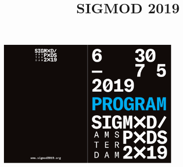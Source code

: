 \documentclass[10pt,paper=a6,twoside=true,BCOR=10mm,DIV=calc]{scrbook}
\title{SIGMOD 2019}
\begin{document}

\afterpage{\restorepagecolor}




\thispagestyle{empty}
\begin{minipage}{\textwidth}
\vspace{3mm}
\hspace*{2mm}\includegraphics[width=90mm]{images/front.pdf}
\setlength\parindent{0pt}
\end{minipage}






\thispagestyle{empty}

~\newpage


\setcounter{page}{1}





~\newpage~\newpage
\tableofcontents

\clearpage











% 

\end{document}
